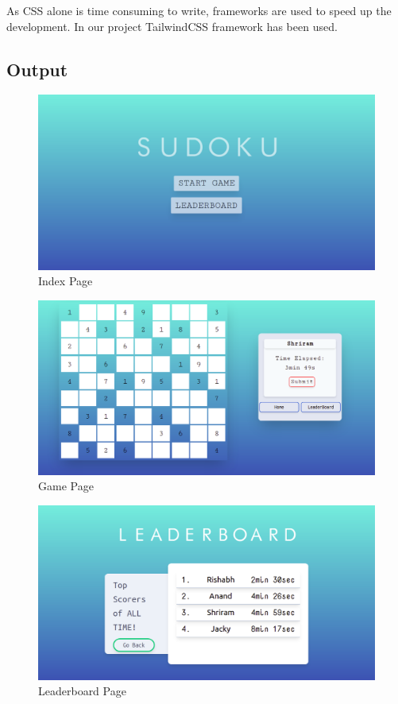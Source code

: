 \documentclass[12pt, a4paper]{report}
\begin{document}
    As CSS alone is time consuming to write, frameworks are used to speed up the development.
    In our project TailwindCSS framework has been used.
    
    \newpage
    \subsection{Output}
    
    \begin{figure}[h!]
        \includegraphics[scale=0.34]{index-webpage}
        \caption{Index Page}
        \label{fig:index-webpage}
    \end{figure}
    
    \begin{figure}[h!]
        \includegraphics[scale=0.35]{game-webpage}
        \caption{Game Page}
        \label{fig:game-webpage}
    \end{figure}
    
    \begin{figure}[h!]
        \includegraphics[scale=0.35]{leaderboard-webpage}
        \caption{Leaderboard Page}
        \label{fig:leaderboard-webpage}
    \end{figure}
    
\end{document}
